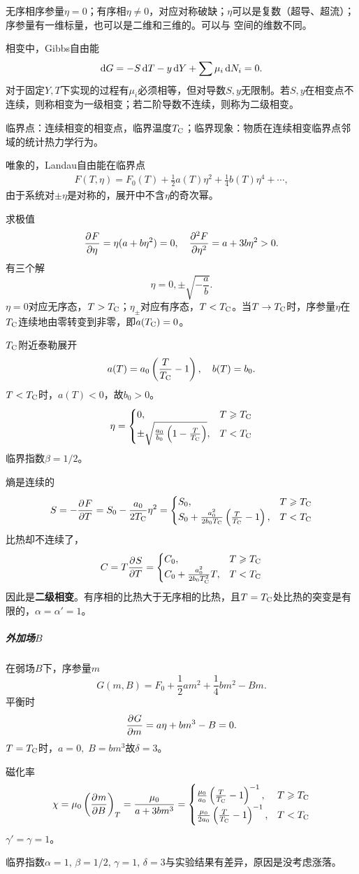 无序相序参量$\eta=0$；有序相$\eta\neq 0$，对应对称破缺；$\eta$可以是复数（超导、超流）；序参量有一维标量，也可以是二维和三维的。可以与
空间的维数不同。

相变中，Gibbs自由能
\[
	\d G=-S\d T-y\d Y+\sum\mu_i\d N_i=0.
\]
对于固定$Y,T$下实现的过程有$\mu_i$必须相等，但对导数$S,y$无限制。若$S,y$在相变点不连续，则称相变为一级相变；若二阶导数不连续，则称为二级相变。

临界点：连续相变的相变点，临界温度$T_\crt$；临界现象：物质在连续相变临界点邻域的统计热力学行为。

唯象的，Landau自由能在临界点
\begin{align}
	F(T,\eta)=F_0(T)+\frac12a(T)\eta^2+\frac14b(T)\eta^4+\cdots,
\end{align}
由于系统对$\pm\eta$是对称的，展开中不含$\eta$的奇次幂。

求极值
\[
	\pv F\eta=\eta(a+b\eta^2)=0,\quad\pv[2]F\eta=a+3b\eta^2>0.
\]
有三个解
\[
	\eta=0,\pm\sqrt{-\frac ab}.
\]
$\eta=0$对应无序态，$T>T_\crt$；$\eta_\pm$对应有序态，$T<T_\crt$。当$T\to T_\crt$时，序参量$\eta$在$T_\crt$连续地由零转变到非零，即$a(T_\crt)=0$。

$T_\crt$附近泰勒展开
\[
	a(T)=a_0\kh{\frac T{T_\crt}-1},\quad b(T)=b_0.
\]
$T<T_\crt$时，$a(T)<0$，故$b_0>0$。
\[
	\eta=
	\begin{cases}
		0,&T\geqslant T_\crt\\
		\pm\sqrt{\frac{a_0}{b_0}\kh{1-\frac T{T_\crt}}},&T<T_\crt
	\end{cases}
\]
临界指数$\beta=1/2$。

熵是连续的
\begin{align*}
	S=-\pv FT=S_0-\frac{a_0}{2T_\crt}\eta^2=
	\begin{cases}
		S_0,                             & T\geqslant T_\crt \\
		S_0+\frac{a_0^2}{2b_0T_\crt}\kh{\frac T{T_\crt}-1}, & T<T_\crt
	\end{cases}
\end{align*}
比热却不连续了，
\begin{align*}
	C=T\pv ST=
	\begin{cases}
		C_0,                 & T\geqslant T_\crt \\
		C_0+\frac{a_0^2}{2b_0T_\crt^2}T, & T<T_\crt
	\end{cases}
\end{align*}
因此是\textbf{二级相变}。有序相的比热大于无序相的比热，且$T=T_\crt$处比热的突变是有限的，$\alpha=\alpha'=1$。
\subparagraph*{外加场$B$}在弱场$B$下，序参量$m$
\[
	G(m,B)=F_0+\frac12am^2+\frac14bm^2-Bm.
\]
平衡时
\[
	\pv Gm=a\eta+bm^3-B=0.
\]
$T=T_\crt$时，$a=0,\;B=bm^3$故$\delta=3$。

磁化率
\[
	\chi=\mu_0\kh{\pv mB}_T=\frac{\mu_0}{a+3bm^3}=
	\begin{cases}
		\frac{\mu_0}{a_0}\kh{\frac T{T_\crt}-1}^{-1},&T\geqslant T_\crt \\
		\frac{\mu_0}{2a_0}\kh{\frac T{T_\crt}-1}^{-1}, & T<T_\crt
	\end{cases}
\]
$\gamma'=\gamma=1$。

临界指数$\alpha=1,\,\beta=1/2,\,\gamma=1,\,\delta=3$与实验结果有差异，原因是没考虑涨落。